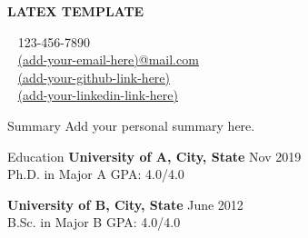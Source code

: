 \documentclass{resume} %
\begin{document}
\begin{minipage}{.6\textwidth}
\Huge \textbf{LATEX TEMPLATE}
\end{minipage}
\begin{minipage}{.4\textwidth}
\faPhone     ~ 123-456-7890 \\ 
\faEnvelopeO ~ \href{mailto:(add-your-email-here@mail.com)}{(add-your-email-here)@mail.com} \\
\faGithub    ~ \url{(add-your-github-link-here)}\\
\faLinkedin  ~ \url{(add-your-linkedin-link-here)}
\end{minipage}


\begin{rSection}{Summary}
Add your personal summary here.
\end{rSection}
\begin{rSection}{Education}
{\bf University of A, City, State}        \hfill {Nov 2019} \\ 
Ph.D. in Major A                          \hfill {GPA: 4.0/4.0}  

{\bf University of B, City, State}        \hfill {June 2012} \\ 
B.Sc. in Major B                          \hfill {GPA: 4.0/4.0}
\end{rSection}

\end{document}
